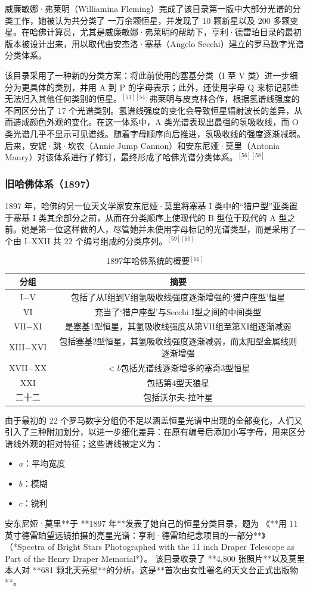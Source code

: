威廉敏娜·弗莱明（Williamina Fleming）完成了该目录第一版中大部分光谱的分类工作，她被认为共分类了 一万余颗恒星，并发现了 10 颗新星以及 200 多颗变星。在哈佛计算员，尤其是威廉敏娜·弗莱明的帮助下，亨利·德雷珀目录的最初版本被设计出来，用以取代由安杰洛·塞基（Angelo Secchi）建立的罗马数字光谱分类体系。

该目录采用了一种新的分类方案：将此前使用的塞基分类（I 至 V 类）进一步细分为更具体的类别，并用 A 到 P 的字母表示；此外，还使用字母 Q 来标记那些无法归入其他任何类别的恒星。$^{[53][54]}$弗莱明与皮克林合作，根据氢谱线强度的不同区分出了 17 个光谱类别。氢谱线强度的变化会导致恒星辐射波长的差异，从而造成颜色外观的变化。在这一体系中，A 类光谱表现出最强的氢吸收线，而 O 类光谱几乎不显示可见谱线。随着字母顺序向后推进，氢吸收线的强度逐渐减弱。后来，安妮·跳·坎农（Annie Jump Cannon）和安东尼娅·莫里（Antonia Maury）对该体系进行了修订，最终形成了哈佛光谱分类体系。$^{[56][58]}$
\subsubsection{旧哈佛体系（1897）}
1897 年，哈佛的另一位天文学家安东尼娅·莫里将塞基 I 类中的“猎户型”亚类置于塞基 I 类其余部分之前，从而在分类顺序上使现代的 B 型位于现代的 A 型之前。她是第一位这样做的人，尽管她并未使用字母标记的光谱类型，而是采用了一个由 I–XXII 共 22 个编号组成的分类序列。$^{[59][60]}$
\begin{table}[ht]
\centering
\caption{1897年哈佛系统的概要$^{[61]}$}\label{tab_Stcl3}
\begin{tabular}{|c|c|}
\hline
\textbf{分组} & \textbf{摘要}\\
\hline
I−V & 包括了从I组到V组氢吸收线强度逐渐增强的‘猎户座型’恒星\\
\hline
VI & 充当了‘猎户座型’与Secchi I型之间的中间类型\\
\hline
VII−XI & 是塞基1型恒星，其氢吸收线强度从第VII组至第XI组逐渐减弱\\
\hline
XIII−XVI & 包括塞基2型恒星，其氢吸收线强度逐渐减弱，而太阳型金属线则逐渐增强\\
\hline
XVII−XX & $<b$包括光谱线逐渐增多的塞奇3型恒星\\
\hline
XXI & 包括第4型天狼星\\
\hline
二十二 & 包括沃尔夫-拉叶星\\
\hline
\end{tabular}
\end{table}
由于最初的 22 个罗马数字分组仍不足以涵盖恒星光谱中出现的全部变化，人们又引入了三种附加划分，以进一步细化差异：在原有编号后添加小写字母，用来区分谱线外观的相对特征；这些谱线被定义为：
\begin{itemize}
\item $a$：平均宽度
\item $b$：模糊
\item $c$：锐利
\end{itemize}
安东尼娅·莫里**于 **1897 年**发表了她自己的恒星分类目录，题为
《**用 11 英寸德雷珀望远镜拍摄的亮星光谱：亨利·德雷珀纪念项目的一部分**》（*Spectra of Bright Stars Photographed with the 11 inch Draper Telescope as Part of the Henry Draper Memorial*）。
该目录收录了 **4,800 张照片**以及莫里本人对 **681 颗北天亮星**的分析。这是**首次由女性署名的天文台正式出版物**。
